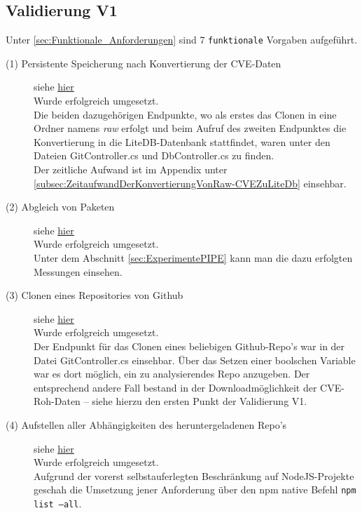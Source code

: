 \subsection{Validierung V1} \label{sec:Vali1}
    Unter \ref{sec:Funktionale_Anforderungen}  sind 7 \texttt{funktionale} Vorgaben aufgeführt.
    
    \begin{description}
        \item[(1) Persistente Speicherung nach Konvertierung der \ac{CVE}-Daten] siehe \hyperref[f:one]{\underline{hier}} \hfill \\
            Wurde erfolgreich umgesetzt.
            \\
            Die beiden dazugehörigen Endpunkte, wo als erstes das Clonen in eine Ordner namens \textit{raw} erfolgt und beim Aufruf des zweiten Endpunktes die Konvertierung in die LiteDB-Datenbank stattfindet, waren unter den Dateien GitController.cs und DbController.cs zu finden.
            \\
            Der zeitliche Aufwand ist im Appendix unter \ref{subsec:ZeitaufwandDerKonvertierungVonRaw-CVEZuLiteDb} einsehbar.
        \item[(2) Abgleich von Paketen] siehe \hyperref[f:two]{\underline{hier}} \hfill \\
            Wurde erfolgreich umgesetzt.
            \\
            Unter dem Abschnitt \ref{sec:ExperimentePIPE}  kann man die dazu erfolgten Messungen einsehen.
        \item[(3) Clonen eines Repositories von Github] siehe \hyperref[f:three]{\underline{hier}} \hfill \\
            Wurde erfolgreich umgesetzt.
            \\
            Der Endpunkt für das Clonen eines beliebigen Github-Repo's war in der Datei GitController.cs einsehbar.
            Über das Setzen einer boolschen Variable war es dort möglich, ein zu analysierendes Repo anzugeben.
            Der entsprechend andere Fall bestand in der Downloadmöglichkeit der \ac{CVE}-Roh-Daten -- siehe hierzu den ersten Punkt der Validierung V1.
        \item[(4) Aufstellen aller Abhängigkeiten des heruntergeladenen Repo's] siehe \hyperref[f:four]{\underline{hier}} \hfill \\
            Wurde erfolgreich umgesetzt.
            \\
            Aufgrund der vorerst selbstauferlegten Beschränkung auf NodeJS-Projekte geschah die Umsetzung jener Anforderung über den npm native Befehl \texttt{npm list --all}.

\end{description}
